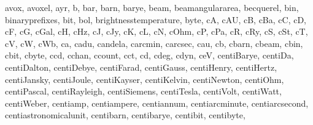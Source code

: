 \documentclass[letterpaper,10pt,english]{sphinxmanual}
\begin{document}
\begin{sphinxVerbatim}[commandchars=\\\{\}]
 \PYGZsq{}avox\PYGZsq{},
 \PYGZsq{}avoxel\PYGZsq{},
 \PYGZsq{}ayr\PYGZsq{},
 \PYGZsq{}b\PYGZsq{},
 \PYGZsq{}bar\PYGZsq{},
 \PYGZsq{}barn\PYGZsq{},
 \PYGZsq{}barye\PYGZsq{},
 \PYGZsq{}beam\PYGZsq{},
 \PYGZsq{}beam\PYGZus{}angular\PYGZus{}area\PYGZsq{},
 \PYGZsq{}becquerel\PYGZsq{},
 \PYGZsq{}bin\PYGZsq{},
 \PYGZsq{}binary\PYGZus{}prefixes\PYGZsq{},
 \PYGZsq{}bit\PYGZsq{},
 \PYGZsq{}bol\PYGZsq{},
 \PYGZsq{}brightness\PYGZus{}temperature\PYGZsq{},
 \PYGZsq{}byte\PYGZsq{},
 \PYGZsq{}cA\PYGZsq{},
 \PYGZsq{}cAU\PYGZsq{},
 \PYGZsq{}cB\PYGZsq{},
 \PYGZsq{}cBa\PYGZsq{},
 \PYGZsq{}cC\PYGZsq{},
 \PYGZsq{}cD\PYGZsq{},
 \PYGZsq{}cF\PYGZsq{},
 \PYGZsq{}cG\PYGZsq{},
 \PYGZsq{}cGal\PYGZsq{},
 \PYGZsq{}cH\PYGZsq{},
 \PYGZsq{}cHz\PYGZsq{},
 \PYGZsq{}cJ\PYGZsq{},
 \PYGZsq{}cJy\PYGZsq{},
 \PYGZsq{}cK\PYGZsq{},
 \PYGZsq{}cL\PYGZsq{},
 \PYGZsq{}cN\PYGZsq{},
 \PYGZsq{}cOhm\PYGZsq{},
 \PYGZsq{}cP\PYGZsq{},
 \PYGZsq{}cPa\PYGZsq{},
 \PYGZsq{}cR\PYGZsq{},
 \PYGZsq{}cRy\PYGZsq{},
 \PYGZsq{}cS\PYGZsq{},
 \PYGZsq{}cSt\PYGZsq{},
 \PYGZsq{}cT\PYGZsq{},
 \PYGZsq{}cV\PYGZsq{},
 \PYGZsq{}cW\PYGZsq{},
 \PYGZsq{}cWb\PYGZsq{},
 \PYGZsq{}ca\PYGZsq{},
 \PYGZsq{}cadu\PYGZsq{},
 \PYGZsq{}candela\PYGZsq{},
 \PYGZsq{}carcmin\PYGZsq{},
 \PYGZsq{}carcsec\PYGZsq{},
 \PYGZsq{}cau\PYGZsq{},
 \PYGZsq{}cb\PYGZsq{},
 \PYGZsq{}cbarn\PYGZsq{},
 \PYGZsq{}cbeam\PYGZsq{},
 \PYGZsq{}cbin\PYGZsq{},
 \PYGZsq{}cbit\PYGZsq{},
 \PYGZsq{}cbyte\PYGZsq{},
 \PYGZsq{}ccd\PYGZsq{},
 \PYGZsq{}cchan\PYGZsq{},
 \PYGZsq{}ccount\PYGZsq{},
 \PYGZsq{}cct\PYGZsq{},
 \PYGZsq{}cd\PYGZsq{},
 \PYGZsq{}cdeg\PYGZsq{},
 \PYGZsq{}cdyn\PYGZsq{},
 \PYGZsq{}ceV\PYGZsq{},
 \PYGZsq{}centiBarye\PYGZsq{},
 \PYGZsq{}centiDa\PYGZsq{},
 \PYGZsq{}centiDalton\PYGZsq{},
 \PYGZsq{}centiDebye\PYGZsq{},
 \PYGZsq{}centiFarad\PYGZsq{},
 \PYGZsq{}centiGauss\PYGZsq{},
 \PYGZsq{}centiHenry\PYGZsq{},
 \PYGZsq{}centiHertz\PYGZsq{},
 \PYGZsq{}centiJansky\PYGZsq{},
 \PYGZsq{}centiJoule\PYGZsq{},
 \PYGZsq{}centiKayser\PYGZsq{},
 \PYGZsq{}centiKelvin\PYGZsq{},
 \PYGZsq{}centiNewton\PYGZsq{},
 \PYGZsq{}centiOhm\PYGZsq{},
 \PYGZsq{}centiPascal\PYGZsq{},
 \PYGZsq{}centiRayleigh\PYGZsq{},
 \PYGZsq{}centiSiemens\PYGZsq{},
 \PYGZsq{}centiTesla\PYGZsq{},
 \PYGZsq{}centiVolt\PYGZsq{},
 \PYGZsq{}centiWatt\PYGZsq{},
 \PYGZsq{}centiWeber\PYGZsq{},
 \PYGZsq{}centiamp\PYGZsq{},
 \PYGZsq{}centiampere\PYGZsq{},
 \PYGZsq{}centiannum\PYGZsq{},
 \PYGZsq{}centiarcminute\PYGZsq{},
 \PYGZsq{}centiarcsecond\PYGZsq{},
 \PYGZsq{}centiastronomical\PYGZus{}unit\PYGZsq{},
 \PYGZsq{}centibarn\PYGZsq{},
 \PYGZsq{}centibarye\PYGZsq{},
 \PYGZsq{}centibit\PYGZsq{},
 \PYGZsq{}centibyte\PYGZsq{},

\end{sphinxVerbatim}
\end{document}
